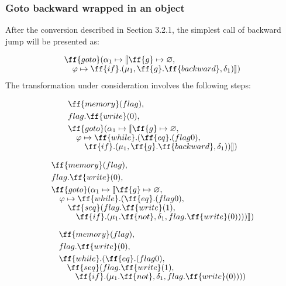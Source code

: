 \documentclass[sigplan,review,11pt,nonacm,natbib=false]{acmart}
\newcommand\br{\\[-4pt]}
\begin{document}
\subsubsection{Goto backward wrapped in an object}
After the conversion described in Section 3.2.1, the simplest call of backward jump will be presented as:

\begin{equation}
\begin{split}
& \ff{goto}(\alpha_1 \mapsto \llbracket \ff{g} \mapsto \varnothing, \br
& \quad \varphi \mapsto \ff{if}.( \mu_1, \ff{g}.\ff{backward}, \delta_1 ) \rrbracket) \br
\end{split}
\end{equation}

The transformation under consideration involves the following steps:

\begin{equation}
\begin{split}
& \ff{memory}(flag), \\
& flag.\ff{write}(0), \\
& \ff{goto}(\alpha_1 \mapsto \llbracket \ff{g} \mapsto \varnothing, \br
& \quad \varphi \mapsto \ff{while}.(\ff{eq}.(flag 0), \br
& \quad \quad \ff{if}.( \mu_1, \ff{g}.\ff{backward}, \delta_1 ))\rrbracket) \\[-1pt]
\end{split}
\end{equation}

\begin{equation}
\begin{split}
& \ff{memory}(flag), \\
& flag.\ff{write}(0), \\
& \ff{goto}(\alpha_1 \mapsto \llbracket \ff{g} \mapsto \varnothing, \br
& \quad \varphi \mapsto \ff{while}.(\ff{eq}.(flag 0), \br
& \quad \quad \ff{seq}(flag.\ff{write}(1), \br
& \quad \quad  \quad \ff{if}.( \mu_1.\ff{not}, \delta_1, flag.\ff{write}(0) )))\rrbracket) \\[-1pt]
\end{split}
\end{equation}

\begin{equation}
\begin{split}
& \ff{memory}(flag), \\
& flag.\ff{write}(0), \\
& \ff{while}.(\ff{eq}.(flag 0), \br
& \quad \ff{seq}(flag.\ff{write}(1), \br
& \quad \quad \ff{if}.( \mu_1.\ff{not}, \delta_1, flag.\ff{write}(0) ))) \\[-1pt]
\end{split}
\end{equation}
\end{document}
